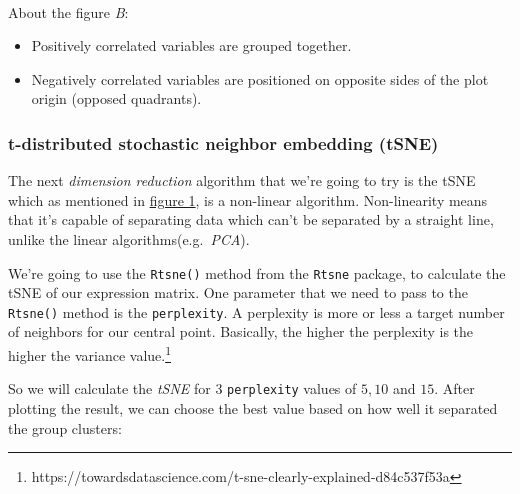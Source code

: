 \documentclass[11pt]{article}
\providecommand{\tightlist}{%
      \setlength{\itemsep}{0pt}\setlength{\parskip}{0pt}}
\begin{document}
    \begin{center}
    \end{center}
    { \hspace*{\fill} \\}
    
    About the figure \emph{B}:

\begin{itemize}
\tightlist
\item
  Positively correlated variables are grouped together.
\item
  Negatively correlated variables are positioned on opposite sides of
  the plot origin (opposed quadrants).
\end{itemize}
\newpage
    \hypertarget{t-distributed-stochastic-neighbor-embedding-tsne}{%
\subsubsection{t-distributed stochastic neighbor embedding
(tSNE)}\label{t-distributed-stochastic-neighbor-embedding-tsne}}

The next \emph{dimension reduction} algorithm that we're going to try is
the tSNE which as mentioned in \hyperref[fig-1]{figure 1}, is a
non-linear algorithm. Non-linearity means that it's capable of
separating data which can't be separated by a straight line, unlike the
linear algorithms(e.g.~\emph{PCA}).

We're going to use the \texttt{Rtsne()} method from the \texttt{Rtsne}
package, to calculate the tSNE of our expression matrix. One parameter
that we need to pass to the \texttt{Rtsne()} method is the
\texttt{perplexity}. A perplexity is more or less a target number of
neighbors for our central point. Basically, the higher the perplexity is
the higher the variance value.\footnote{https://towardsdatascience.com/t-sne-clearly-explained-d84c537f53a}

So we will calculate the \emph{tSNE} for 3 \texttt{perplexity} values of
\(5, 10\) and \(15\). After plotting the result, we can choose the best
value based on how well it separated the group clusters:
\end{document}
